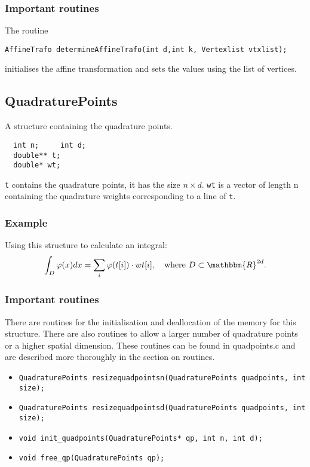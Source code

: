 \documentclass[a4paper,10pt]{article}
\newcommand{\real}{\mathbbm{R}}
\begin{document}
\subsubsection*{Important routines}
The routine 
\begin{verbatim}AffineTrafo determineAffineTrafo(int d,int k, Vertexlist vtxlist);\end{verbatim}
initialises the affine transformation and sets the values using the list of vertices.

\subsection{QuadraturePoints}
A structure containing the quadrature points.
\begin{verbatim}
  int n;     int d;
  double** t;
  double* wt;
\end{verbatim}
\verb=t= contains the quadrature points, it has the size $n \times d$. \verb=wt= is a vector of length n 
containing the quadrature weights corresponding to a line of \verb=t=.
\subsubsection*{Example}
Using this structure to calculate an integral:
\begin{displaymath}
  \int_D \varphi(x) dx = \sum_i \varphi(t[i])\cdot wt[i],~~\text{ where }D\subset \real^{2d}.
\end{displaymath}

\subsubsection*{Important routines}
There are routines for the initialisation and deallocation of the memory for this structure. There are
also routines to allow a larger number of quadrature points or a higher spatial dimension. These routines can be 
found in quadpoints.c and are described more thoroughly in the section on routines.
\begin{itemize}
\item \begin{verbatim}QuadraturePoints resizequadpointsn(QuadraturePoints quadpoints, int size);\end{verbatim}
\item \begin{verbatim}QuadraturePoints resizequadpointsd(QuadraturePoints quadpoints, int size);\end{verbatim}
\item \begin{verbatim}void init_quadpoints(QuadraturePoints* qp, int n, int d); \end{verbatim}
\item \begin{verbatim}void free_qp(QuadraturePoints qp);\end{verbatim}
\end{itemize}
\end{document}
